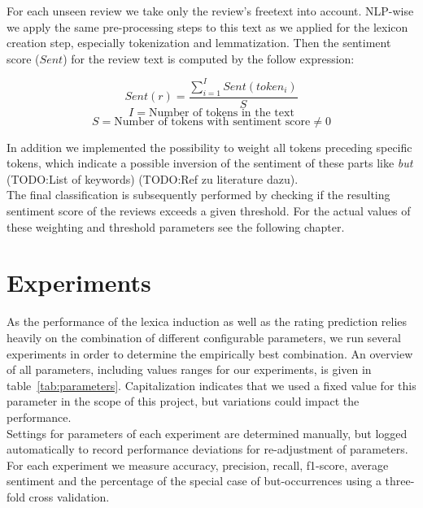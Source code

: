 \documentclass[11pt,titlepage,oneside,openany]{book}
\begin{document}
For each unseen review we take only the review's freetext into account. NLP-wise we apply the same pre-processing steps to this text as we applied for the lexicon creation step, especially tokenization and lemmatization. Then the sentiment score ($Sent$) for the review text is computed by the follow expression:

$$ Sent(r) =  \frac{\sum_{i=1}^{I}Sent(token_i)}{S}$$
$$ I = \text{Number of tokens in the text}$$
$$ S = \text{Number of tokens with sentiment score} \neq 0$$

In addition we implemented the possibility to weight all tokens preceding specific tokens, which indicate a possible inversion of the sentiment of these parts like \emph{but} (TODO:List of keywords) (TODO:Ref zu literature dazu).\\
The final classification is subsequently performed by checking if the resulting sentiment score of the reviews exceeds a given threshold. For the actual values of these weighting and threshold parameters see the following chapter.

\section{Experiments}
As the performance of the lexica induction as well as the rating prediction relies heavily on the combination of different configurable parameters, we run several experiments in order to determine the empirically best combination. An overview of all parameters, including values ranges for our experiments, is given in table~\ref{tab:parameters}. Capitalization indicates that we used a fixed value for this parameter in the scope of this project, but variations could impact the performance.\\

Settings for parameters of each experiment are determined manually, but logged automatically to record performance deviations for re-adjustment of parameters. For each experiment we measure accuracy, precision, recall, f1-score, average sentiment and the percentage of the special case of but-occurrences using a three-fold cross validation.
\end{document}
